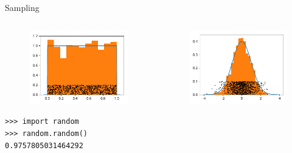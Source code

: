 \documentclass[12pt, aspectratio=149]{beamer}
\theoremstyle{plain}
\begin{document}
\begin{frame}[fragile]{Sampling}
\begin{columns}
\begin{column}{0.5\textwidth}
    \begin{center}
     \begin{figure}
     	\centering
     	\includegraphics[width=0.99\linewidth]{figures/uniform_samples_hist}
     \end{figure}
     \begin{verbatim}
>>> import random
>>> random.random()
0.9757805031464292
     \end{verbatim}
     \end{center}
\end{column}
\begin{column}{0.5\textwidth}  %
    \begin{center}
     \begin{figure}
     	\centering
     	\includegraphics[width=0.99\linewidth]{figures/normal_samples_hist}

\end{figure}
\end{center}
\end{column}
\end{columns}
\end{frame}
\end{document}
